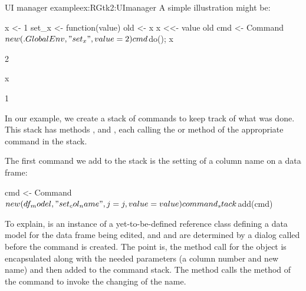 \begin{example}{UI manager example}{ex:RGtk2:UImanager}
A simple illustration might be:
\begin{Schunk}
\begin{Sinput}
 x <- 1
 set_x <- function(value) {
   old <- x
   x <<- value
   old
 }
 cmd <- Command$new(.GlobalEnv, "set_x", value = 2)
 cmd$do(); x
\end{Sinput}
\begin{Soutput}
[1] 2
\end{Soutput}
\end{Schunk}
\begin{Schunk}
\end{Schunk}
\begin{Schunk}
\begin{Sinput}
 x
\end{Sinput}
\begin{Soutput}
[1] 1
\end{Soutput}
\end{Schunk}

In our example, we create a stack of commands to keep track of what
was done. This stack has methods ,  and
, each calling the  or  method of the
appropriate command in the stack.

The first command we add to the stack is the setting of a column name
on a data frame:
\begin{Schunk}
\begin{Sinput}
 cmd <- Command$new(df_model, "set_col_name", j = j, value = value)
 command_stack$add(cmd)
\end{Sinput}
\end{Schunk}
%
To explain,  is an instance of a yet-to-be-defined
reference class defining a data model for the data frame being edited,
and  and  are determined by a dialog called before
the command is created. The point is, the method call for the
 object is encapsulated along with the needed
parameters (a column number and new name) and then added to the
command stack. The  method calls the  method of the
command to invoke the changing of the name.


\end{example}
